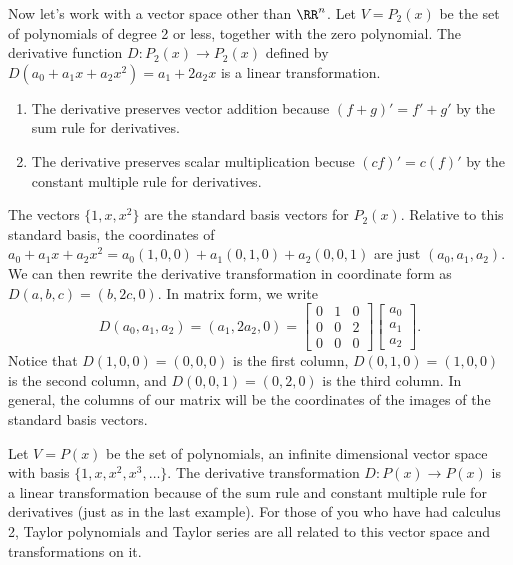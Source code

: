 \begin{example}\label{ltex matrix2}
Now let's work with a vector space other than $\RR^n$. 
Let $V=P_2(x)$ be the set of polynomials of degree 2 or less, together with the zero polynomial.  
The derivative function $D\colon P_2(x)\to P_2(x)$ defined by $D(a_0+a_1x+a_2x^2)=a_1+2a_2x$ is a linear transformation. 
\begin{enumerate}
	\item The derivative preserves vector addition because $(f+g)'=f'+g'$ by the sum rule for derivatives.
	\item The derivative preserves scalar multiplication becuse $(cf)'=c(f)'$ by the constant multiple rule for derivatives.
\end{enumerate}
The vectors $\{1,x,x^2\}$ are the standard basis vectors for $P_2(x)$. 
Relative to this standard basis, the coordinates of $a_0+a_1x+a_2x^2 = a_0(1,0,0)+a_1(0,1,0)+a_2(0,0,1)$ are just $(a_0,a_1,a_2)$. 
We can then rewrite the derivative transformation in coordinate form as $D(a,b,c) = (b,2c,0)$. 
In matrix form, we write
 $$D(a_0,a_1,a_2)
 =(a_1,2a_2,0)
 =\begin{bmatrix}0&1&0\\0&0&2\\0&0&0\end{bmatrix}\begin{bmatrix}a_0\\a_1\\a_2\end{bmatrix}.$$ 
 Notice that $D(1,0,0)=(0,0,0)$ is the first column, $D(0,1,0)=(1,0,0)$ is the second column, and $D(0,0,1)=(0,2,0)$ is the third column. 
 In general, the columns of our matrix will be the coordinates of the images of the standard basis vectors.
\end{example}

\begin{example}
Let $V=P(x)$ be the set of polynomials, an infinite dimensional vector space with basis $\{1,x,x^2,x^3,\ldots\}$.  
The derivative transformation $D\colon P(x)\to P(x)$ is a linear transformation because of the sum rule and constant multiple rule for derivatives (just as in the last example). 
For those of you who have had calculus 2, Taylor polynomials and Taylor series are all related to this vector space and transformations on it.
\end{example}

